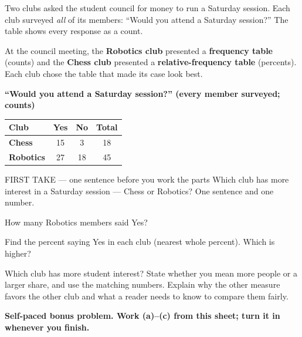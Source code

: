 \documentclass[14pt]{extarticle}
\begin{document}
\pagestyle{empty}


\noindent\begin{minipage}[t]{0.57\linewidth}
\vspace{0pt}
Two clubs asked the student council for money to run a Saturday session. Each club surveyed \emph{all} of its members: ``Would you attend a Saturday session?'' The table shows every response as a count.\par\smallskip At the council meeting, the \textbf{Robotics club} presented a \textbf{frequency table} (counts) and the \textbf{Chess club} presented a \textbf{relative-frequency table} (percents). Each club chose the table that made its case look best.\par
\end{minipage}\hfill
\begin{minipage}[t]{0.40\linewidth}
\vspace{0pt}
\begin{center}
\textbf{``Would you attend a Saturday session?'' (every member surveyed; counts)}\par\smallskip
\begin{tabular}{|l|c|c|c|}
\hline
\textbf{Club} & \textbf{Yes} & \textbf{No} & \textbf{Total} \\ \hline
\textbf{Chess} & 15 & 3 & 18 \\ \hline
\textbf{Robotics} & 27 & 18 & 45 \\ \hline
\end{tabular}
\end{center}
\end{minipage}

\begin{firsttakebox}{FIRST TAKE --- one sentence before you work the parts}
Which club has more interest in a Saturday session --- Chess or Robotics? One sentence and one number.
\end{firsttakebox}

\begin{description}[leftmargin=1.15in, labelwidth=1in, itemsep=2pt, topsep=2pt]
  \item[\dokbadge{1}~(a)] How many Robotics members said Yes?
  \item[\dokbadge{2}~(b)] Find the percent saying Yes in each club (nearest whole percent). Which is higher?
  \item[\dokbadge{3}~(c)] Which club has more student interest? State whether you mean more people or a larger share, and use the matching numbers. Explain why the other measure favors the other club and what a reader needs to know to compare them fairly.
\end{description}

\vfill
\textbf{Self-paced bonus problem. Work (a)--(c) from this sheet; turn it in whenever you finish.}
\end{document}
